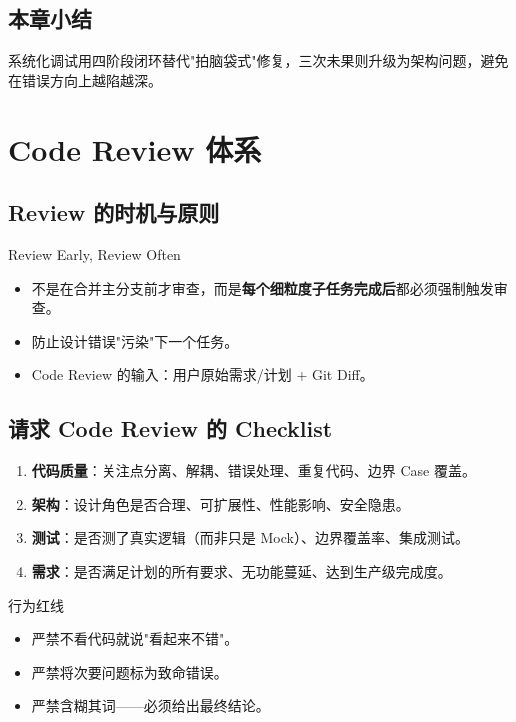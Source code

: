 \documentclass[a4paper]{article}
\begin{document}
\subsection{本章小结}

系统化调试用四阶段闭环替代"拍脑袋式"修复，三次未果则升级为架构问题，避免在错误方向上越陷越深。


\section{Code Review 体系}

\subsection{Review 的时机与原则}

\begin{importantbox}{{Review Early, Review Often}}
\begin{itemize}
    \item 不是在合并主分支前才审查，而是\textbf{每个细粒度子任务完成后}都必须强制触发审查。
    \item 防止设计错误"污染"下一个任务。
    \item Code Review 的输入：用户原始需求/计划 + Git Diff。
\end{itemize}
\end{importantbox}

\subsection{请求 Code Review 的 Checklist}

\begin{enumerate}
    \item \textbf{代码质量}：关注点分离、解耦、错误处理、重复代码、边界 Case 覆盖。
    \item \textbf{架构}：设计角色是否合理、可扩展性、性能影响、安全隐患。
    \item \textbf{测试}：是否测了真实逻辑（而非只是 Mock）、边界覆盖率、集成测试。
    \item \textbf{需求}：是否满足计划的所有要求、无功能蔓延、达到生产级完成度。
\end{enumerate}

\begin{warningbox}{行为红线}
\begin{itemize}
    \item 严禁不看代码就说"看起来不错"。
    \item 严禁将次要问题标为致命错误。
    \item 严禁含糊其词——必须给出最终结论。
\end{itemize}
\end{warningbox}
\end{document}
